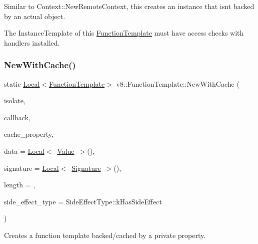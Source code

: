 Similar to Context\+::\+New\+Remote\+Context, this creates an instance that isn\textquotesingle{}t backed by an actual object.

The Instance\+Template of this \mbox{\hyperlink{classv8_1_1FunctionTemplate}{Function\+Template}} must have access checks with handlers installed. \mbox{\label{classv8_1_1FunctionTemplate_a0718db9d9b5ca6e37899ec15b208c0ba}} 
\subsubsection{\texorpdfstring{New\+With\+Cache()}{NewWithCache()}}
{\footnotesize\ttfamily static \mbox{\hyperlink{classv8_1_1Local}{Local}}$<$\mbox{\hyperlink{classv8_1_1FunctionTemplate}{Function\+Template}}$>$ v8\+::\+Function\+Template\+::\+New\+With\+Cache (\begin{DoxyParamCaption}\item[{Isolate $\ast$}]{isolate,  }\item[{Function\+Callback}]{callback,  }\item[{\mbox{\hyperlink{classv8_1_1Local}{Local}}$<$ \mbox{\hyperlink{classv8_1_1Private}{Private}} $>$}]{cache\+\_\+property,  }\item[{\mbox{\hyperlink{classv8_1_1Local}{Local}}$<$ \mbox{\hyperlink{classv8_1_1Value}{Value}} $>$}]{data = {\ttfamily \mbox{\hyperlink{classv8_1_1Local}{Local}}$<$~\mbox{\hyperlink{classv8_1_1Value}{Value}}~$>$()},  }\item[{\mbox{\hyperlink{classv8_1_1Local}{Local}}$<$ \mbox{\hyperlink{classv8_1_1Signature}{Signature}} $>$}]{signature = {\ttfamily \mbox{\hyperlink{classv8_1_1Local}{Local}}$<$~\mbox{\hyperlink{classv8_1_1Signature}{Signature}}~$>$()},  }\item[{int}]{length = {},  }\item[{\mbox{\hyperlink{namespacev8_a29711319c2b9fc7716d65faee2f7b9cb}{Side\+Effect\+Type}}}]{side\+\_\+effect\+\_\+type = {\ttfamily SideEffectType\+:\+:kHasSideEffect} }\end{DoxyParamCaption})\hspace{0.3cm}{\ttfamily [static]}}

Creates a function template backed/cached by a private property. \mbox{\label{classv8_1_1FunctionTemplate_aa2bcc2652b5f0fdbc666d943ccf72021}} 
